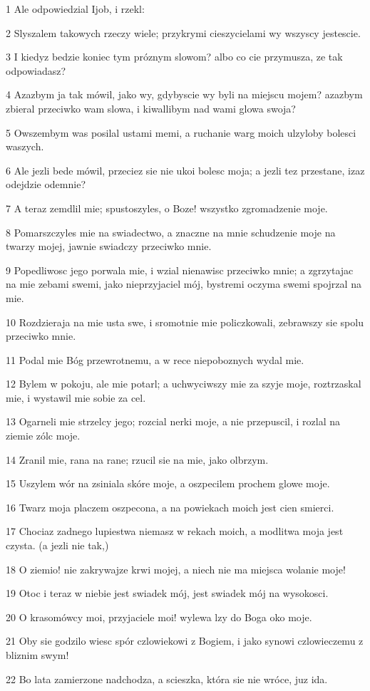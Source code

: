 \par 1 Ale odpowiedzial Ijob, i rzekl:
\par 2 Slyszalem takowych rzeczy wiele; przykrymi cieszycielami wy wszyscy jestescie.
\par 3 I kiedyz bedzie koniec tym próznym slowom? albo co cie przymusza, ze tak odpowiadasz?
\par 4 Azazbym ja tak mówil, jako wy, gdybyscie wy byli na miejscu mojem? azazbym zbieral przeciwko wam slowa, i kiwallibym nad wami glowa swoja?
\par 5 Owszembym was posilal ustami memi, a ruchanie warg moich ulzyloby bolesci waszych.
\par 6 Ale jezli bede mówil, przeciez sie nie ukoi bolesc moja; a jezli tez przestane, izaz odejdzie odemnie?
\par 7 A teraz zemdlil mie; spustoszyles, o Boze! wszystko zgromadzenie moje.
\par 8 Pomarszczyles mie na swiadectwo, a znaczne na mnie schudzenie moje na twarzy mojej, jawnie swiadczy przeciwko mnie.
\par 9 Popedliwosc jego porwala mie, i wzial nienawisc przeciwko mnie; a zgrzytajac na mie zebami swemi, jako nieprzyjaciel mój, bystremi oczyma swemi spojrzal na mie.
\par 10 Rozdzieraja na mie usta swe, i sromotnie mie policzkowali, zebrawszy sie spolu przeciwko mnie.
\par 11 Podal mie Bóg przewrotnemu, a w rece niepoboznych wydal mie.
\par 12 Bylem w pokoju, ale mie potarl; a uchwyciwszy mie za szyje moje, roztrzaskal mie, i wystawil mie sobie za cel.
\par 13 Ogarneli mie strzelcy jego; rozcial nerki moje, a nie przepuscil, i rozlal na ziemie zólc moje.
\par 14 Zranil mie, rana na rane; rzucil sie na mie, jako olbrzym.
\par 15 Uszylem wór na zsiniala skóre moje, a oszpecilem prochem glowe moje.
\par 16 Twarz moja placzem oszpecona, a na powiekach moich jest cien smierci.
\par 17 Chociaz zadnego lupiestwa niemasz w rekach moich, a modlitwa moja jest czysta. (a jezli nie tak,)
\par 18 O ziemio! nie zakrywajze krwi mojej, a niech nie ma miejsca wolanie moje!
\par 19 Otoc i teraz w niebie jest swiadek mój, jest swiadek mój na wysokosci.
\par 20 O krasomówcy moi, przyjaciele moi! wylewa lzy do Boga oko moje.
\par 21 Oby sie godzilo wiesc spór czlowiekowi z Bogiem, i jako synowi czlowieczemu z bliznim swym!
\par 22 Bo lata zamierzone nadchodza, a scieszka, która sie nie wróce, juz ida.

